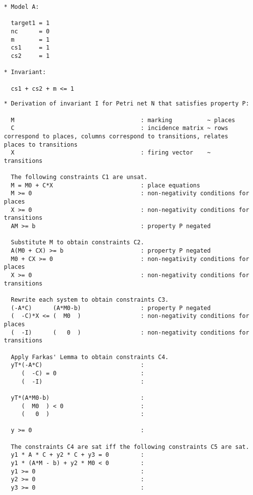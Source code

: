 \documentclass{article}
\begin{document}
\begin{verbatim}
* Model A:

  target1 = 1
  nc      = 0
  m       = 1
  cs1     = 1
  cs2     = 1
  
* Invariant:

  cs1 + cs2 + m <= 1

\end{verbatim}

\newpage
\begin{verbatim}
* Derivation of invariant I for Petri net N that satisfies property P:

  M                                    : marking          ~ places
  C                                    : incidence matrix ~ rows correspond to places, columns correspond to transitions, relates places to transitions
  X                                    : firing vector    ~ transitions

  The following constraints C1 are unsat.
  M = M0 + C*X                         : place equations
  M >= 0                               : non-negativity conditions for places
  X >= 0                               : non-negativity conditions for transitions
  AM >= b                              : property P negated

  Substitute M to obtain constraints C2.
  A(M0 + CX) >= b                      : property P negated
  M0 + CX >= 0                         : non-negativity conditions for places
  X >= 0                               : non-negativity conditions for transitions

  Rewrite each system to obtain constraints C3.
  (-A*C)      (A*M0-b)                 : property P negated
  (  -C)*X <= (  M0  )                 : non-negativity conditions for places
  (  -I)      (   0  )                 : non-negativity conditions for transitions

  Apply Farkas' Lemma to obtain constraints C4.
  yT*(-A*C)                            : 
     (  -C) = 0                        : 
     (  -I)                            : 

  yT*(A*M0-b)                          : 
     (  M0  ) < 0                      : 
     (   0  )                          : 

  y >= 0                               : 

  The constraints C4 are sat iff the following constraints C5 are sat.
  y1 * A * C + y2 * C + y3 = 0         : 
  y1 * (A*M - b) + y2 * M0 < 0         : 
  y1 >= 0                              : 
  y2 >= 0                              : 
  y3 >= 0                              : 


\end{verbatim}
\end{document}
